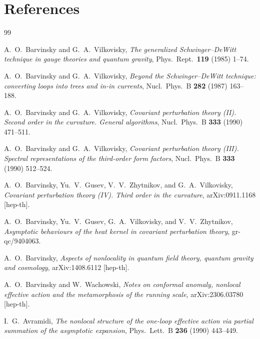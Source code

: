 \documentclass[12pt,a4paper]{article}
\theoremstyle{definition}
\theoremstyle{remark}
\begin{document}
\section*{References}

\begin{thebibliography}{99}

  A.~O.~Barvinsky and G.~A.~Vilkovisky,
  \emph{The generalized Schwinger--DeWitt technique in gauge theories
  and quantum gravity},
  Phys.\ Rept.\ \textbf{119} (1985) 1--74.

  A.~O.~Barvinsky and G.~A.~Vilkovisky,
  \emph{Beyond the Schwinger--DeWitt technique: converting loops into
  trees and in-in currents},
  Nucl.\ Phys.\ B \textbf{282} (1987) 163--188.

  A.~O.~Barvinsky and G.~A.~Vilkovisky,
  \emph{Covariant perturbation theory (II). Second order in the
  curvature. General algorithms},
  Nucl.\ Phys.\ B \textbf{333} (1990) 471--511.

  A.~O.~Barvinsky and G.~A.~Vilkovisky,
  \emph{Covariant perturbation theory (III). Spectral representations
  of the third-order form factors},
  Nucl.\ Phys.\ B \textbf{333} (1990) 512--524.

  A.~O.~Barvinsky, Yu.~V.~Gusev, V.~V.~Zhytnikov, and
  G.~A.~Vilkovisky,
  \emph{Covariant perturbation theory (IV). Third order in the
  curvature},
  arXiv:0911.1168 [hep-th].

  A.~O.~Barvinsky, Yu.~V.~Gusev, G.~A.~Vilkovisky, and
  V.~V.~Zhytnikov,
  \emph{Asymptotic behaviours of the heat kernel in covariant
  perturbation theory},
  gr-qc/9404063.

  A.~O.~Barvinsky,
  \emph{Aspects of nonlocality in quantum field theory, quantum gravity
  and cosmology},
  arXiv:1408.6112 [hep-th].

  A.~O.~Barvinsky and W.~Wachowski,
  \emph{Notes on conformal anomaly, nonlocal effective action and the
  metamorphosis of the running scale},
  arXiv:2306.03780 [hep-th].

  I.~G.~Avramidi,
  \emph{The nonlocal structure of the one-loop effective action via
  partial summation of the asymptotic expansion},
  Phys.\ Lett.\ B \textbf{236} (1990) 443--449.


\end{thebibliography}
\end{document}
